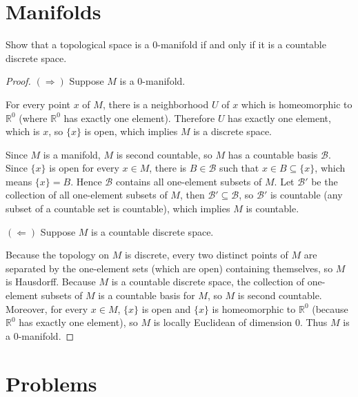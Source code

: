 \section*{Manifolds}

\begin{exercise}{2.54}
	Show that a topological space is a $0$-manifold if and only if it is a countable discrete space.
\end{exercise}

\begin{proof}
	$(\Longrightarrow)$ Suppose $M$ is a $0$-manifold.

	For every point $x$ of $M$, there is a neighborhood $U$ of $x$ which is homeomorphic to $\mathbb{R}^{0}$ (where $\mathbb{R}^{0}$ has exactly one element). Therefore $U$ has exactly one element, which is $x$, so $\{ x \}$ is open, which implies $M$ is a discrete space.

	Since $M$ is a manifold, $M$ is second countable, so $M$ has a countable basis $\mathscr{B}$. Since $\{ x \}$ is open for every $x\in M$, there is $B\in\mathscr{B}$ such that $x\in B\subseteq \{x\}$, which means $\{ x \} = B$. Hence $\mathscr{B}$ contains all one-element subsets of $M$. Let $\mathscr{B}'$ be the collection of all one-element subsets of $M$, then $\mathscr{B}'\subseteq\mathscr{B}$, so $\mathscr{B}'$ is countable (any subset of a countable set is countable), which implies $M$ is countable.

	$(\Longleftarrow)$ Suppose $M$ is a countable discrete space.

	Because the topology on $M$ is discrete, every two distinct points of $M$ are separated by the one-element sets (which are open) containing themselves, so $M$ is Hausdorff. Because $M$ is a countable discrete space, the collection of one-element subsets of $M$ is a countable basis for $M$, so $M$ is second countable. Moreover, for every $x\in M$, $\{ x \}$ is open and $\{ x \}$ is homeomorphic to $\mathbb{R}^{0}$ (because $\mathbb{R}^{0}$ has exactly one element), so $M$ is locally Euclidean of dimension $0$. Thus $M$ is a $0$-manifold.
\end{proof}

\section*{Problems}

